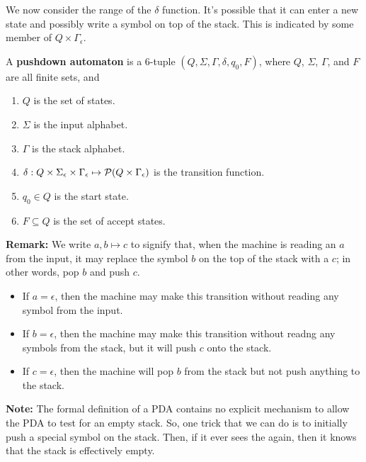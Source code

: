\documentclass[letterpaper]{article}
\begin{document}
\bigskip 

We now consider the range of the $\delta$ function. It's possible that it can enter a new state and possibly write a symbol on top of the stack. This is indicated by some member of $Q \times \Gamma_{\epsilon}$. 

\begin{definition}{}{}
    A \textbf{pushdown automaton} is a 6-tuple $(Q, \Sigma, \Gamma, \delta, q_0, F)$, where $Q$, $\Sigma$, $\Gamma$, and $F$ are all finite sets, and
    \begin{enumerate}
        \item $Q$ is the set of states. 
        \item $\Sigma$ is the input alphabet. 
        \item $\Gamma$ is the stack alphabet.
        \item $\delta: Q \times \Sigma_{\epsilon} \times \Gamma_{\epsilon} \mapsto \mathcal{P}(Q \times \Gamma_{\epsilon})$ is the transition function.
        \item $q_0 \in Q$ is the start state. 
        \item $F \subseteq Q$ is the set of accept states. 
    \end{enumerate} 
\end{definition}
\textbf{Remark:} We write $a, b \mapsto c$ to signify that, when the machine is reading an $a$ from the input, it may replace the symbol $b$ on the top of the stack with a $c$; in other words, pop $b$ and push $c$. 
\begin{itemize}
    \item If $a = \epsilon$, then the machine may make this transition without reading any symbol from the input. 
    \item If $b = \epsilon$, then the machine may make this transition without readng any symbols from the stack, but it will push $c$ onto the stack. 
    \item If $c = \epsilon$, then the machine will pop $b$ from the stack but not push anything to the stack. 
\end{itemize}
\textbf{Note:} The formal definition of a PDA contains no explicit mechanism to allow the PDA to test for an empty stack. So, one trick that we can do is to initially push a special symbol \code{\$} on the stack. Then, if it ever sees the \code{\$} again, then it knows that the stack is effectively empty. 
\end{document}
